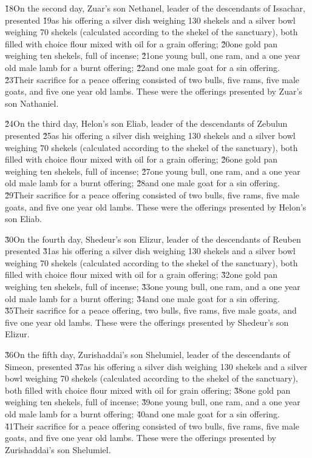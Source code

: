\v{18}On the second day, Zuar's son Nethanel, leader of the descendants of Issachar, presented \v{19}as his offering a silver dish weighing 130 shekels and a silver bowl weighing 70 shekels (calculated according to the shekel of the sanctuary), both filled with choice flour mixed with oil for a grain offering; \v{20}one gold pan weighing ten shekels, full of incense; \v{21}one young bull, one ram, and a one year old male lamb for a burnt offering; \v{22}and one male goat for a sin offering. \v{23}Their sacrifice for a peace offering consisted of two bulls, five rams, five male goats, and five one year old lambs. These were the offerings presented by Zuar's son Nathaniel.

\v{24}On the third day, Helon's son Eliab, leader of the descendants of Zebulun presented \v{25}as his offering a silver dish weighing 130 shekels and a silver bowl weighing 70 shekels (calculated according to the shekel of the sanctuary), both filled with choice flour mixed with oil for a grain offering; \v{26}one gold pan weighing ten shekels, full of incense; \v{27}one young bull, one ram, and a one year old male lamb for a burnt offering; \v{28}and one male goat for a sin offering. \v{29}Their sacrifice for a peace offering consisted of two bulls, five rams, five male goats, and five one year old lambs. These were the offerings presented by Helon's son Eliab.

\v{30}On the fourth day, Shedeur's son Elizur, leader of the descendants of Reuben presented \v{31}as his offering a silver dish weighing 130 shekels and a silver bowl weighing 70 shekels (calculated according to the shekel of the sanctuary), both filled with choice flour mixed with oil for a grain offering; \v{32}one gold pan weighing ten shekels, full of incense; \v{33}one young bull, one ram, and a one year old male lamb for a burnt offering; \v{34}and one male goat for a sin offering. \v{35}Their sacrifice for a peace offering, two bulls, five rams, five male goats, and five one year old lambs. These were the offerings presented by Shedeur's son Elizur.

\v{36}On the fifth day, Zurishaddai's son Shelumiel, leader of the descendants of Simeon, presented \v{37}as his offering a silver dish weighing 130 shekels and a silver bowl weighing 70 shekels (calculated according to the shekel of the sanctuary), both filled with choice flour mixed with oil for grain offering; \v{38}one gold pan weighing ten shekels, full of incense; \v{39}one young bull, one ram, and a one year old male lamb for a burnt offering; \v{40}and one male goat for a sin offering. \v{41}Their sacrifice for a peace offering consisted of two bulls, five rams, five male goats, and five one year old lambs. These were the offerings presented by Zurishaddai's son Shelumiel.

